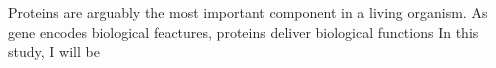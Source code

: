 Proteins are arguably  the most important component in a living organism. As gene encodes biological feactures, proteins deliver biological functions   In this study, I will be 